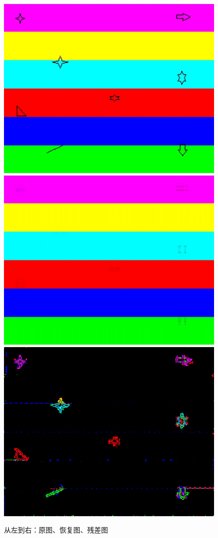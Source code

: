 \documentclass{article}
\begin{document}
    \begin{figure}[h]
    	\includegraphics[scale=0.56]{../figures/test-1.png}
    	\quad
    	\includegraphics[scale=0.28]{../figures/A-6.png}
    	\quad
    	\includegraphics[scale=0.28]{../figures/E-6.png}
    	\caption{从左到右：原图、恢复图、残差图}
    \end{figure}
     
\end{document}
